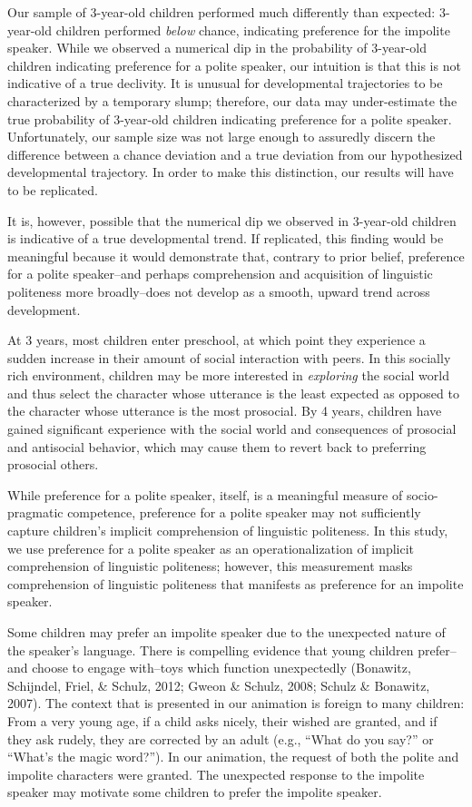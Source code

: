 \documentclass[
  english,
  man,floatsintext]{apa6}
\begin{document}
Our sample of 3-year-old children performed much differently than expected: 3-year-old children performed \emph{below} chance, indicating preference for the impolite speaker. While we observed a numerical dip in the probability of 3-year-old children indicating preference for a polite speaker, our intuition is that this is not indicative of a true declivity. It is unusual for developmental trajectories to be characterized by a temporary slump; therefore, our data may under-estimate the true probability of 3-year-old children indicating preference for a polite speaker. Unfortunately, our sample size was not large enough to assuredly discern the difference between a chance deviation and a true deviation from our hypothesized developmental trajectory. In order to make this distinction, our results will have to be replicated.

It is, however, possible that the numerical dip we observed in 3-year-old children is indicative of a true developmental trend. If replicated, this finding would be meaningful because it would demonstrate that, contrary to prior belief, preference for a polite speaker--and perhaps comprehension and acquisition of linguistic politeness more broadly--does not develop as a smooth, upward trend across development.

At 3 years, most children enter preschool, at which point they experience a sudden increase in their amount of social interaction with peers. In this socially rich environment, children may be more interested in \emph{exploring} the social world and thus select the character whose utterance is the least expected as opposed to the character whose utterance is the most prosocial. By 4 years, children have gained significant experience with the social world and consequences of prosocial and antisocial behavior, which may cause them to revert back to preferring prosocial others.

While preference for a polite speaker, itself, is a meaningful measure of socio-pragmatic competence, preference for a polite speaker may not sufficiently capture children's implicit comprehension of linguistic politeness. In this study, we use preference for a polite speaker as an operationalization of implicit comprehension of linguistic politeness; however, this measurement masks comprehension of linguistic politeness that manifests as preference for an impolite speaker.

Some children may prefer an impolite speaker due to the unexpected nature of the speaker's language. There is compelling evidence that young children prefer--and choose to engage with--toys which function unexpectedly (Bonawitz, Schijndel, Friel, \& Schulz, 2012; Gweon \& Schulz, 2008; Schulz \& Bonawitz, 2007). The context that is presented in our animation is foreign to many children: From a very young age, if a child asks nicely, their wished are granted, and if they ask rudely, they are corrected by an adult (e.g., ``What do you say?'' or ``What's the magic word?''). In our animation, the request of both the polite and impolite characters were granted. The unexpected response to the impolite speaker may motivate some children to prefer the impolite speaker.
\end{document}
